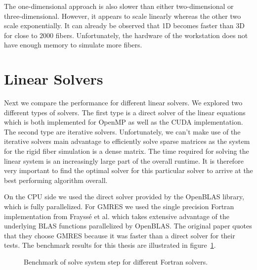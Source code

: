\documentclass[a4paper,11pt]{kth-mag}
\begin{document}
The one-dimensional approach is also slower than either two-dimensional or three-dimensional. However, it appears to scale linearly whereas the other two scale exponentially. It can already be observed that 1D becomes faster than 3D for close to $2000$ fibers. Unfortunately, the hardware of the workstation does not have enough memory to simulate more fibers.

\section{Linear Solvers}
\label{sec:bench_linear_solvers}

Next we compare the performance for different linear solvers. We explored two different types of solvers. The first type is a direct solver of the linear equations which is both implemented for OpenMP as well as the CUDA implementation. The second type are iterative solvers. Unfortunately, we can't make use of the iterative solvers main advantage to efficiently solve sparse matrices as the system for the rigid fiber simulation is a dense matrix. The time required for solving the linear system is an increasingly large part of the overall runtime. It is therefore very important to find the optimal solver for this particular solver to arrive at the best performing algorithm overall.

On the CPU side we used the direct solver provided by the OpenBLAS library, which is fully parallelized. For GMRES we used the single precision Fortran implementation from Frayssé et al. which takes extensive advantage of the underlying BLAS functions parallelized by OpenBLAS. The original paper quotes that they choose GMRES because it was faster than a direct solver for their tests. The benchmark results for this thesis are illustrated in figure~\ref{fig:bench_openmp_solvers}.

\begin{figure}[!htbp]
  \centering
  \caption{Benchmark of solve system step for different Fortran solvers.}
  \label{fig:bench_openmp_solvers}
\end{figure}
\end{document}
